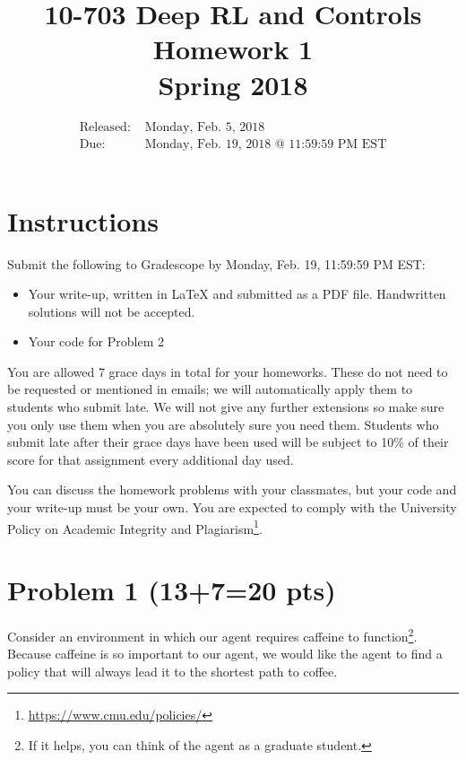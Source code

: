 \documentclass[12pt]{article}
\title{10-703 Deep RL and Controls\\
  Homework 1\\
  Spring 2018
}
\date{\vspace{-50pt}
\begin{align*}
\text{Released: } & \text{Monday, Feb. 5, 2018} \\
\text{Due: } & \text{Monday, Feb. 19, 2018 @ 11:59:59 PM EST}
\end{align*}
}
\begin{document}
\maketitle

\section*{Instructions}

\noindent Submit the following to Gradescope by Monday, Feb. 19, 11:59:59 PM EST:
\begin{itemize}
\item Your write-up, written in LaTeX and submitted as a PDF file. Handwritten solutions will not be accepted.
\item Your code for Problem 2
\end{itemize}

\noindent You are allowed 7 grace days in total for your homeworks. These do not need to be requested or mentioned in emails; we will automatically apply them to students who submit late. We will not give any further extensions so make sure you only use them when you are absolutely sure you need them. Students who submit late after their grace days have been used will be subject to 10\% of their score for that assignment every additional day used.

\bigskip

\noindent  You can discuss the homework problems with your classmates, but your code and your write-up must be your own. You are expected to comply with the University Policy on Academic Integrity and Plagiarism\footnote{\url{https://www.cmu.edu/policies/}}.

\section*{Problem 1 (13+7=20 pts)}
\label{sec:p1}

Consider an environment in which our agent requires caffeine to function\footnote{If it helps, you can think of the agent as a graduate student.}. Because caffeine is so important to our agent, we would like the agent to find a policy that will always lead it to the shortest path to coffee.
\end{document}

